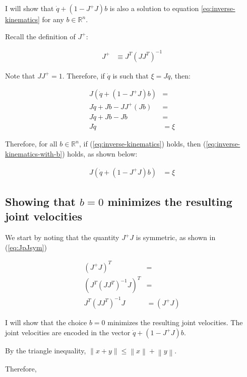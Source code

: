 \documentclass{article}
\begin{document}
I will show that $\dot{q} + \left( 1 - J^+J \right) b$ is also a solution to
	equation \ref{eq:inverse-kinematics} for any $b \in \mathbb{R}^n$.

Recall the definition of $J^+$:

\begin{align}
	J^+ & \equiv J^T (J J^T)^{-1}
\end{align}

Note that $J J^+ = 1$.
Therefore, if $\dot{q}$ is such that $\xi = J \dot{q}$, then:

\begin{align}
	J \left( \dot{q} + \left( 1 - J^+J \right) b \right) & = \nonumber \\
	J \dot{q} + J b - J J^+ (J b) & = \nonumber \\
	J \dot{q} + J b - J b & = \nonumber \\
	J \dot{q} & = \xi \nonumber
\end{align}

Therefore, for all $b \in \mathbb{R}^n$, if (\ref{eq:inverse-kinematics}) holds,
	then (\ref{eq:inverse-kinematics-with-b}) holds, as shown below:

\begin{align}
	J \left( \dot{q} + (1 - J^+ J ) b \right) & = \xi 
		\label{eq:inverse-kinematics-with-b}
\end{align}

\subsection{Showing that $b = 0$ minimizes the resulting joint velocities}

We start by noting that the quantity $J^+ J$ is symmetric, as shown in (\ref{eq:JpJsym})

\begin{align}
	\left(J^+ J \right)^T & = \nonumber \\
	\left( J^T (J J^T)^{-1} J \right)^T & = \nonumber \\
	J^T (J J^T)^{-1} J & = \left(J^+ J \right) \label{eq:JpJsym}
\end{align}

I will show that the choice $b = 0$ minimizes the resulting joint velocities.
The joint velocities are encoded in the vector $\dot{q} + (1 - J^+ J) b$.

By the triangle inequality, $\left\lVert x + y \right\rVert 
	\leq \left\lVert x \right\rVert + \left\lVert y \right\rVert$.

Therefore,
\end{document}
